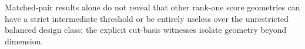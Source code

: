 Matched-pair results alone do not reveal that other rank-one score geometries can have a strict intermediate threshold or be entirely useless over the unrestricted balanced design class; the explicit cut-basis witnesses isolate geometry beyond dimension.
